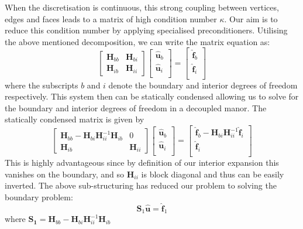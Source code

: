 When the discretisation is continuous, this strong coupling between vertices,
edges and faces leads to a matrix of high condition number $\kappa$. Our aim is
to reduce this condition number by applying specialised
preconditioners. Utilising the above mentioned decomposition, we can write the
matrix equation as:
%
\[
\left[\begin{array}{cc}
  \mathbf{H}_{bb} & \mathbf{H}_{bi}\\
  \mathbf{H}_{ib} & \mathbf{H}_{ii}
  \end{array}\right]
\left[ \begin{array}{c}
\hat{\mathbf{u}}_{b}\\
\hat{\mathbf{u}}_{i}\\
\end{array}\right] =
\left[ \begin{array}{c}
\hat{\mathbf{f}}_{b}\\
\hat{\mathbf{f}}_{i}\\
\end{array}\right]
\]
%
where the subscripts $b$ and $i$ denote the boundary and interior degrees of
freedom respectively. This system then can be statically condensed allowing us
to solve for the boundary and interior degrees of freedom in a decoupled
manor. The statically condensed matrix is given by
%
\[
\left[\begin{array}{cc}
  \mathbf{H}_{bb}-\mathbf{H}_{bi} \mathbf{H}_{ii}^{-1} \mathbf{H}_{ib} & 0\\
  \mathbf{H}_{ib} & \mathbf{H}_{ii}
  \end{array}\right]
\left[ \begin{array}{c}
\hat{\mathbf{u}}_{b}\\
\hat{\mathbf{u}}_{i}\\
\end{array}\right] =
\left[ \begin{array}{c}
\hat{\mathbf{f}}_{b}-\mathbf{H}_{bi} \mathbf{H}_{ii}^{-1}\hat{\mathbf{f}}_{i}\\
\hat{\mathbf{f}}_{i}\\
\end{array}\right]
\]
%
This is highly advantageous since by definition of our interior expansion this
vanishes on the boundary, and so $\mathbf{H}_{ii}$ is block diagonal and thus
can be easily inverted. The above sub-structuring has reduced our problem to
solving the boundary problem:
%
\[
\mathbf{S}_{1}\hat{\mathbf{u}} = \hat{\mathbf{f}}_{1}
\]
%
where
$\mathbf{S_{1}}=\mathbf{H}_{bb}-\mathbf{H}_{bi} \mathbf{H}_{ii}^{-1}
\mathbf{H}_{ib}$
